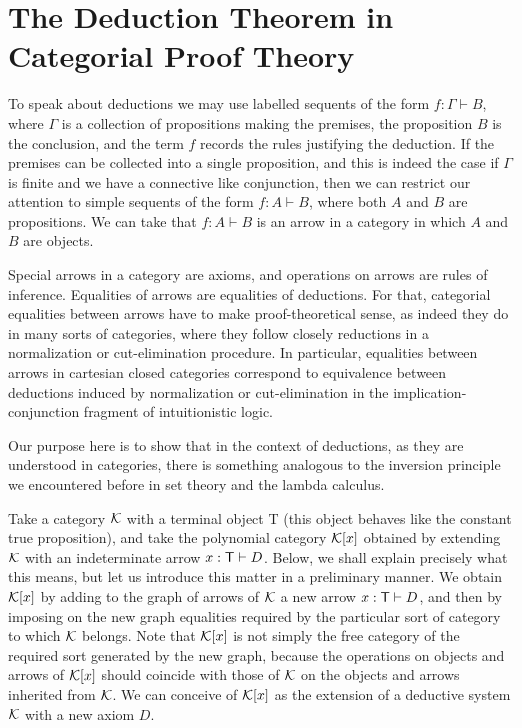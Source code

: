 \section{The Deduction Theorem in Categorial Proof Theory}

\noindent To speak about deductions we may use labelled sequents of the form 
$f:\Gamma \vdash B$, where $\Gamma $ is a collection of propositions making
the premises, the proposition $B$ is the conclusion, and the term $f$
records the rules justifying the deduction. If the premises can be collected
into a single proposition, and this is indeed the case if $\Gamma $ is
finite and we have a connective like conjunction, then we can restrict our
attention to simple sequents of the form $f:A\vdash B$, where both $A$ and $%
B $ are propositions. We can take that $f:A\vdash B$ is an arrow in a
category in which $A$ and $B$ are objects.

Special arrows in a category are axioms, and operations on arrows are rules
of inference. Equalities of arrows are equalities of deductions. For that,
categorial equalities between arrows have to make proof-theoretical sense,
as indeed they do in many sorts of categories, where they follow closely
reductions in a normalization or cut-elimination procedure. In particular,
equalities between arrows in cartesian closed categories correspond to
equivalence between deductions induced by normalization or cut-elimination
in the implication-conjunction fragment of intuitionistic logic.

Our purpose here is to show that in the context of deductions, as they are
understood in categories, there is something analogous to the inversion
principle we encountered before in set theory and the lambda calculus.

Take a category ${\cal K}$ with a terminal object {\sf T} (this object
behaves like the constant true proposition), and take the polynomial
category ${\cal K}[x]$ obtained by extending ${\cal K}$ with an
indeterminate arrow $x:{\sf T}\vdash D$. Below, we shall explain precisely
what this means, but let us introduce this matter in a preliminary manner.
We obtain ${\cal K}[x]$ by adding to the graph of arrows of ${\cal K}$ a new
arrow $x:{\sf T}\vdash D$, and then by imposing on the new graph equalities
required by the particular sort of category to which ${\cal K}$ belongs.
Note that ${\cal K}[x]$ is not simply the free category of the required sort
generated by the new graph, because the operations on objects and arrows of $%
{\cal K}[x]$ should coincide with those of ${\cal K}$ on the objects and
arrows inherited from ${\cal K}$. We can conceive of ${\cal K}[x]$ as the
extension of a deductive system ${\cal K}$ with a new axiom $D$.

